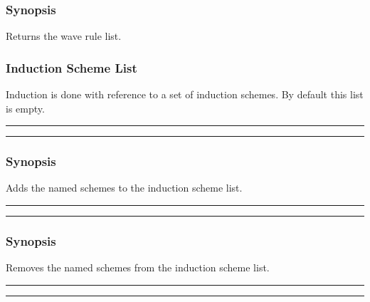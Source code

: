 
\subsubsection*{Synopsis}
Returns the wave rule list.

\subsubsection{Induction Scheme List}
Induction is done with reference
to a set of induction schemes.  By default
this list is empty. 

\vspace{2mm}
\hrule
\vspace{2mm}
\begin{Large}
\end{Large}
\vspace{2mm}
\hrule
\vspace{2mm}


\subsubsection*{Synopsis}
Adds the named schemes to the induction scheme list.

\vspace{2mm}
\hrule
\vspace{2mm}
\begin{Large}
\end{Large}
\vspace{2mm}
\hrule
\vspace{2mm}


\subsubsection*{Synopsis}
Removes the named schemes from the induction scheme list.

\vspace{2mm}
\hrule
\vspace{2mm}
\begin{Large}
\end{Large}
\vspace{2mm}
\hrule
\vspace{2mm}

